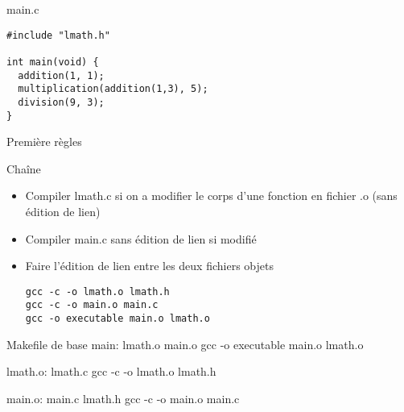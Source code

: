 
\begin{frame}[containsverbatim]{\ftitle}
\def\blocktitle{main.c}
\begin{block}{\blocktitle}
\begin{verbatim}
#include "lmath.h"

int main(void) {
  addition(1, 1);
  multiplication(addition(1,3), 5);
  division(9, 3);
}
\end{verbatim}
\end{block}
\end{frame}


\def\ftitle{Première règles}
\begin{frame}[containsverbatim]{\ftitle}
\def\blocktitle{Chaîne}
\begin{block}{\blocktitle}
\begin{itemize}
\item Compiler lmath.c si on a modifier le corps d'une fonction en fichier .o (sans édition de lien)
\item Compiler main.c sans édition de lien si modifié
\item Faire l'édition de lien entre les deux fichiers objets
\begin{verbatim}
gcc -c -o lmath.o lmath.h
gcc -c -o main.o main.c
gcc -o executable main.o lmath.o
\end{verbatim}
\end{itemize}
\end{block}

\def\blocktitle{Makefile de base}
\begin{block}{\blocktitle}
main: lmath.o main.o
  gcc -o executable main.o lmath.o
  
lmath.o: lmath.c
  gcc -c -o lmath.o lmath.h
  
main.o: main.c lmath.h
  gcc -c -o main.o main.c
  
\end{block}
\end{frame}


